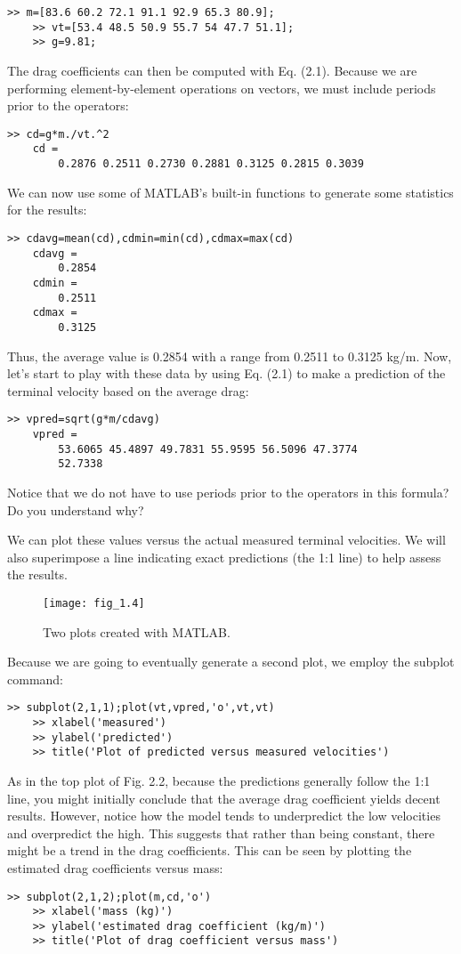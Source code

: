 \documentclass[../main.tex]{subfiles}
\begin{document}
\begin{lstlisting}[frame=none, numbers=none]
	>> m=[83.6 60.2 72.1 91.1 92.9 65.3 80.9];
	>> vt=[53.4 48.5 50.9 55.7 54 47.7 51.1];
	>> g=9.81;
\end{lstlisting}

The drag coefficients can then be computed with Eq. (2.1). Because we are performing
element-by-element operations on vectors, we must include periods prior to the operators:
\begin{lstlisting}[frame=none, numbers=none]
	>> cd=g*m./vt.^2
	cd =
		0.2876 0.2511 0.2730 0.2881 0.3125 0.2815 0.3039
\end{lstlisting}
We can now use some of MATLAB's built-in functions to generate some statistics for the
results:
\begin{lstlisting}[frame=none, numbers=none]
	>> cdavg=mean(cd),cdmin=min(cd),cdmax=max(cd)
	cdavg =
		0.2854
	cdmin =
		0.2511
	cdmax =
		0.3125
\end{lstlisting}
Thus, the average value is 0.2854 with a range from 0.2511 to 0.3125 kg/m.
Now, let's start to play with these data by using Eq. (2.1) to make a prediction of the
terminal velocity based on the average drag:
\begin{lstlisting}[frame=none, numbers=none]
	>> vpred=sqrt(g*m/cdavg)
	vpred =
		53.6065 45.4897 49.7831 55.9595 56.5096 47.3774
		52.7338
\end{lstlisting}
Notice that we do not have to use periods prior to the operators in this formula? Do you
understand why?


We can plot these values versus the actual measured terminal velocities. We will also
superimpose a line indicating exact predictions (the 1:1 line) to help assess the results.


\begin{figure}[H]
	\centering
	\texttt{[image: fig\_1.4]}
   \caption{\textsf{Two plots created with MATLAB.}}
   \label{fig_2.2}
\end{figure}


Because we are going to eventually generate a second plot, we employ the subplot
command:
\begin{lstlisting}[frame=none, numbers=none]
	>> subplot(2,1,1);plot(vt,vpred,'o',vt,vt)
	>> xlabel('measured')
	>> ylabel('predicted')
	>> title('Plot of predicted versus measured velocities')
\end{lstlisting}


As in the top plot of Fig. 2.2, because the predictions generally follow the 1:1 line, you
might initially conclude that the average drag coefficient yields decent results. However,
notice how the model tends to underpredict the low velocities and overpredict the high.
This suggests that rather than being constant, there might be a trend in the drag coefficients.
This can be seen by plotting the estimated drag coefficients versus mass:
\begin{lstlisting}[frame=none, numbers=none]
	>> subplot(2,1,2);plot(m,cd,'o')
	>> xlabel('mass (kg)')
	>> ylabel('estimated drag coefficient (kg/m)')
	>> title('Plot of drag coefficient versus mass')
\end{lstlisting}
\end{document}
